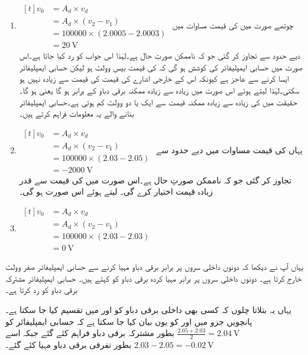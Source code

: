 \begin{enumerate}
\item $\begin{aligned}[t]
v_0 &=A_d \times v_d \\
&=A_d \times \left (v_2 - v_1 \right )\\
&=100000 \times \left(2.0005-2.0003 \right )\\
&=\SI{20}{\volt}
\end{aligned}$
چوتھے صورت میں  کی قیمت مساوات  میں دیے حدود سے تجاوز کر گئی جو کہ ناممکن صورتِ حال ہے۔لہٰذا اس جواب کو رد کیا جاتا ہے۔اس صورت میں حسابی ایمپلیفائر کی کوشش ہو گی کہ  کی قیمت بیس وولٹ ہو لیکن حسابی ایمپلیفائر ایسا کرنے سے عاجز ہے  کیونکہ اس کے خارجی اشارے  کی قیمت  کی قیمت سے زیادہ نہیں ہو سکتی۔لہٰذا   لیتے ہوئے اس صورت میں  زیادہ سے زیادہ ممکنہ برقی دباو کے برابر ہو گا یعنی ہو گا۔حقیقت میں  کی زیادہ سے زیادہ ممکنہ قیمت  سے ایک یا دو وولٹ کم ہوتی ہے۔حسابی ایمپلیفائر بنانے والے یہ معلومات فراہم کرتے ہیں۔
\item $\begin{aligned}[t]
v_0 &=A_d \times v_d \\
&=A_d \times \left (v_2 - v_1 \right )\\
&=100000 \times \left(2.03-2.05 \right )\\
&=\SI{-2000}{\volt}
\end{aligned}$
یہاں  کی قیمت مساوات   میں دیے حدود سے تجاوز کر گئی جو کہ ناممکن صورتِ حال ہے۔اس صورت میں  کی قیمت   سے قدر زیادہ قیمت اختیار کرے گی۔ لیتے ہوئے اس صورت ہو گی۔
\item $\begin{aligned}[t]
v_0 &=A_d \times v_d \\
&=A_d \times \left (v_2 - v_1 \right )\\
&=100000 \times \left(2.03-2.03 \right )\\
&=\SI{0}{\volt}
\end{aligned}$
\end{enumerate}
یہاں آپ نے دیکھا کہ دونوں داخلی سروں پر برابر برقی دباو مہیا کرنے سے حسابی ایمپلیفائر صفر وولٹ خارج کرتا ہے۔ دونوں داخلی سروں پر برابر مہیا کردہ برقی دباو کو   کہتے ہیں۔ حسابی ایمپلیفائر مشترکہ برقی دباو کو رد کرتا ہے۔


یہاں یہ بتلاتا چلوں کہ کسی بھی داخلی برقی دباو کو   اور   میں تقسیم کیا جا سکتا ہے۔پانچویں جزو میں  اور  کو یوں بیان کیا جا سکتا ہے کہ حسابی ایمپلیفائر کو 
\( \tfrac{2.05+2.03}{2}=\SI{2.04}{\volt} \)
بطور مشترکہ برقی دباو فراہم کئے گئے جبکہ اسے
\( 2.03-2.05=\SI{-0.02}{\volt}\)
بطور تفرقی برقی دباو مہیا کئے گئے۔

